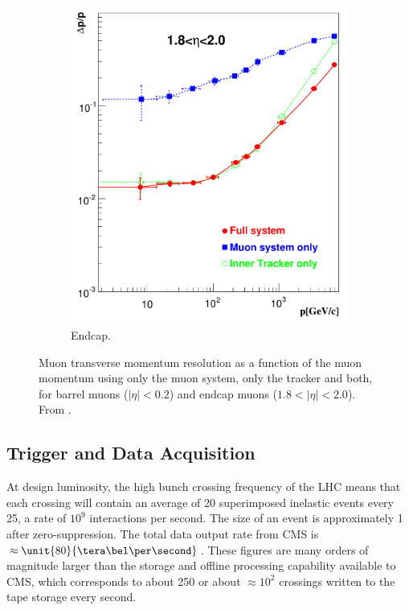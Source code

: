 \begin{figure}[htbp]
\begin{subfigure}{0.48\textwidth}
    \includegraphics[width=\textwidth]{muon_endcap}
    \caption{Endcap.}
    \label{fig:muon_endcap}
  \end{subfigure}
  \caption[Muon transverse momentum resolution as a function of the muon
momentum.] {Muon transverse momentum resolution as a function of the muon
momentum using only the muon system, only the tracker and both, for barrel muons
($|\eta| < 0.2$) and endcap muons ($1.8<|\eta| < 2.0$). From
\cite{chatrchyan2008cms}.\label{fig:muon_performance}}
\end{figure}

\subsection{Trigger and Data Acquisition}
At design luminosity, the high bunch crossing frequency of the LHC means that
each crossing will contain an average of 20 superimposed inelastic
events every \unit{25}{\nano\second}, a rate of $10^{9}$ interactions per
second.
The size of an event is approximately \unit{1}{\mega\bel} after zero-suppression.
The total data output rate from CMS is $\approx \unit{80}{\tera\bel\per\second}$.
These figures are many orders of magnitude larger than the storage and offline
processing capability available to CMS, which corresponds to about
\unit{250}{\mega\bel\per\second} or about $\approx 10^{2}$ crossings written to the tape
storage every second. 

